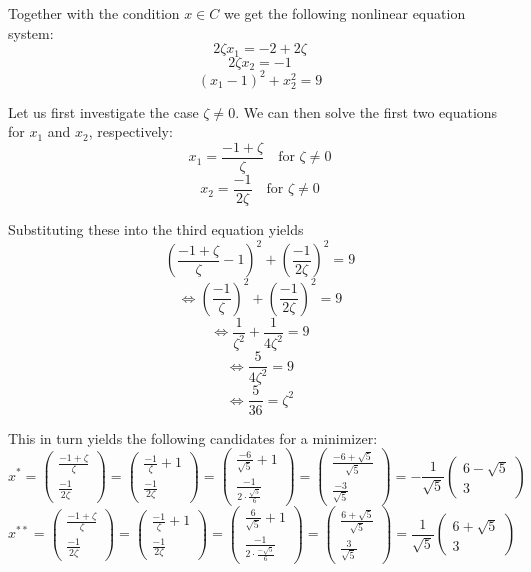 \documentclass{article}
\begin{document}
Together with the condition $x\in C$ we get the following nonlinear equation system:
\[
2\zeta x_{1}=-2+2\zeta
\]
\[
2\zeta x_{2}=-1
\]
\[
(x_{1}-1)^{2}+x_{2}^{2}=9
\]

Let us first investigate the case $\zeta\neq 0$. We can then solve the first two equations for $x_{1}$ and $x_{2}$, respectively:
\[
x_{1}=\frac{-1+\zeta}{\zeta}\quad\text{for }\zeta\neq 0
\]
\[
x_{2}=\frac{-1}{2\zeta}\quad\text{for }\zeta\neq 0
\]

Substituting these into the third equation yields
\[
\left(\frac{-1+\zeta}{\zeta}-1\right)^{2}+\left(\frac{-1}{2\zeta}\right)^{2}=9
\]
\[
\Leftrightarrow \left(\frac{-1}{\zeta}\right)^{2}+\left(\frac{-1}{2\zeta}\right)^{2}=9
\]
\[
\Leftrightarrow \frac{1}{\zeta^{2}}+\frac{1}{4\zeta^{2}}=9
\]
\[
\Leftrightarrow \frac{5}{4\zeta^{2}}=9
\]
\[
\Leftrightarrow \frac{5}{36}=\zeta^{2}
\]

This in turn yields the following candidates for a minimizer:
\[
x^{*} =\begin{pmatrix}\frac{-1+\zeta}{\zeta}\\ \frac{-1}{2\zeta}\end{pmatrix}=\begin{pmatrix}\frac{-1}{\zeta}+1\\ \frac{-1}{2\zeta}\end{pmatrix}=\begin{pmatrix}\frac{-6}{\sqrt{5}}+1\\ \frac{-1}{2\cdot\frac{\sqrt{5}}{6}}\end{pmatrix}=\begin{pmatrix}\frac{-6+\sqrt{5}}{\sqrt{5}}\\ \frac{-3}{\sqrt{5}}\end{pmatrix}=-\frac{1}{\sqrt{5}}\begin{pmatrix}6-\sqrt{5}\\ 3\end{pmatrix}
\]
\[
x^{**} =\begin{pmatrix}\frac{-1+\zeta}{\zeta}\\ \frac{-1}{2\zeta}\end{pmatrix}=\begin{pmatrix}\frac{-1}{\zeta}+1\\ \frac{-1}{2\zeta}\end{pmatrix}=\begin{pmatrix}\frac{6}{\sqrt{5}}+1\\ \frac{-1}{2\cdot\frac{-\sqrt{5}}{6}}\end{pmatrix}=\begin{pmatrix}\frac{6+\sqrt{5}}{\sqrt{5}}\\ \frac{3}{\sqrt{5}}\end{pmatrix}=\frac{1}{\sqrt{5}}\begin{pmatrix}6+\sqrt{5}\\ 3\end{pmatrix}
\]
\end{document}
